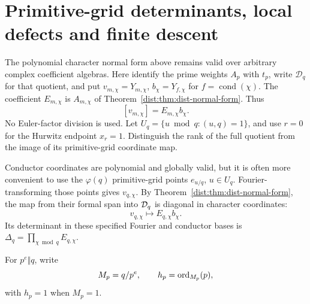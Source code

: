 \section{Primitive-grid determinants, local defects and finite descent}\label{jets:sec:det}
The polynomial character normal form above remains valid over arbitrary
complex coefficient algebras. Here identify the prime weights $A_p$ with
$t_p$, write $\mathcal D_q$ for that quotient, and put
$v_{m,\chi}=Y_{m,\chi}$, $b_\chi=Y_{f,\chi}$ for
$f=\operatorname{cond}(\chi)$. The coefficient $E_{m,\chi}$ is
$A_{m,\chi}$ of Theorem~\ref{dist:thm:dist-normal-form}. Thus
\begin{equation}\label{jets:eq:conductor-normal}
 [v_{m,\chi}]=E_{m,\chi}b_\chi.
\end{equation}
No Euler-factor division is used.
Let $U_q=\{u\bmod q:(u,q)=1\}$, and use $r=0$ for the Hurwitz endpoint
$x_r=1$. Distinguish the rank of the full quotient from the image of
its primitive-grid coordinate map.

Conductor coordinates are polynomial and globally valid, but it is often
more convenient to use the $\varphi(q)$ primitive-grid points
$e_{u/q}$, $u\in U_q$. Fourier-transforming those points gives
$v_{q,\chi}$. By Theorem~\ref{dist:thm:dist-normal-form}, the map from their formal
span into $\mathcal D_q$ is diagonal in character coordinates:
\begin{equation}\label{jets:eq:primitive-diagonal}
 v_{q,\chi}\longmapsto E_{q,\chi}b_\chi.
\end{equation}
Its determinant in these specified Fourier and conductor bases is
$\Delta_q=\prod_{\chi\bmod q}E_{q,\chi}$.

For $p^e\Vert q$, write
\[
 M_p=q/p^e,\qquad h_p=\operatorname{ord}_{M_p}(p),
\]
with $h_p=1$ when $M_p=1$.

